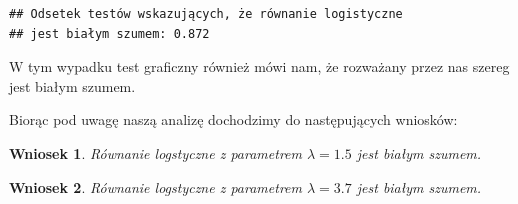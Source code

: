 \documentclass[10pt, a4paper]{article}\usepackage[]{graphicx}\usepackage[]{xcolor}
\makeatletter
\newenvironment{kframe}{%
 \def\at@end@of@kframe{}%
 \ifinner\ifhmode%
  \def\at@end@of@kframe{\end{minipage}}%
  \begin{minipage}{\columnwidth}%
 \fi\fi%
 \def\FrameCommand##1{\hskip\@totalleftmargin \hskip-\fboxsep
 \colorbox{shadecolor}{##1}\hskip-\fboxsep
     \hskip-\linewidth \hskip-\@totalleftmargin \hskip\columnwidth}%
 \MakeFramed {\advance\hsize-\width
   \@totalleftmargin\z@ \linewidth\hsize
   \@setminipage}}%
 {\par\unskip\endMakeFramed%
 \at@end@of@kframe}
\newenvironment{knitrout}{}{} %
\newtheorem{wn}{Wniosek}
\makeatother
\begin{document}
\begin{enumerate}
\begin{itemize}
\begin{knitrout}
\begin{kframe}
\begin{verbatim}
## Odsetek testów wskazujących, że równanie logistyczne
## jest białym szumem: 0.872
\end{verbatim}
\end{kframe}
\end{knitrout}
W tym wypadku test graficzny również mówi nam, że rozważany przez nas szereg jest białym szumem.
\end{itemize}
Biorąc pod uwagę naszą analizę dochodzimy do następujących wniosków:
\begin{wn}{Równanie logstyczne z parametrem $\lambda=1.5$ jest białym szumem.} \end{wn}
\begin{wn}{Równanie logstyczne z parametrem $\lambda=3.7$ jest białym szumem.} \end{wn}
\end{enumerate}
\end{document}
